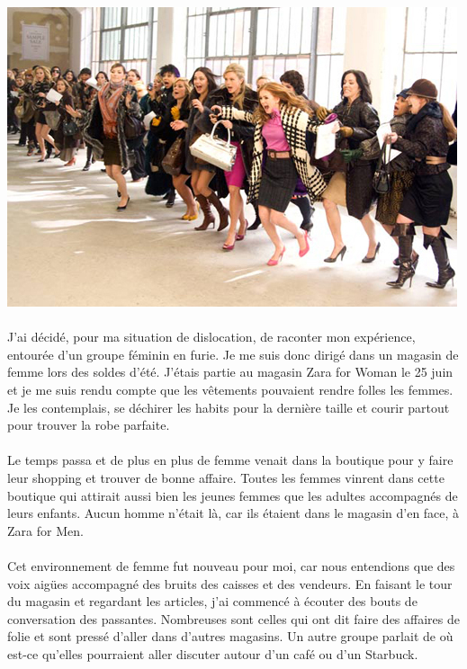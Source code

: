 \begin{center}
	\includegraphics[scale=0.7]{solde.jpg}
\end{center}

\paragraph{} J'ai décidé, pour ma situation de dislocation, de raconter mon
expérience, entourée d'un groupe féminin en furie. Je me suis donc dirigé dans
un magasin de femme lors des soldes d'été. J'étais partie au magasin Zara for
Woman le 25 juin et je me suis rendu compte que les vêtements pouvaient rendre
folles les femmes. Je les contemplais, se déchirer les habits pour la dernière
taille et courir partout pour trouver la robe parfaite.

\paragraph{} Le temps passa et de plus en plus de femme venait dans la boutique
pour y faire leur shopping et trouver de bonne affaire. Toutes les femmes
vinrent dans cette boutique qui attirait aussi bien les jeunes femmes que les
adultes accompagnés de leurs enfants. Aucun homme n'était là, car ils étaient
dans le magasin d'en face, à Zara for Men.

\paragraph{} Cet environnement de femme fut nouveau pour moi, car nous
entendions que des voix aigües accompagné des bruits des caisses et des
vendeurs. En faisant le tour du magasin et regardant les articles, j'ai
commencé à écouter des bouts de conversation des passantes.  Nombreuses sont
celles qui ont dit faire des affaires de folie et sont pressé d'aller dans
d'autres magasins. Un autre groupe parlait de où est-ce qu'elles pourraient
aller discuter autour d'un café ou d'un Starbuck.

